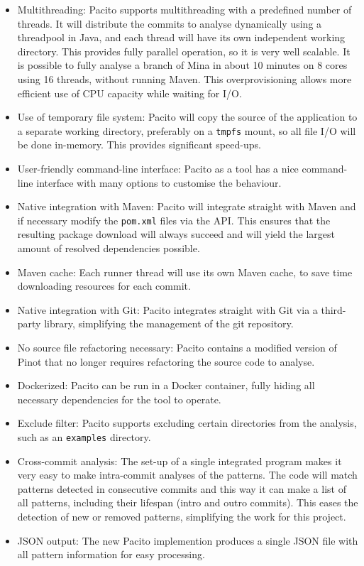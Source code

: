 \begin{itemize}
    \item Multithreading: Pacito supports multithreading with a predefined number of threads. It will distribute the commits to analyse dynamically using a threadpool in Java, and each thread will have its own independent working directory. This provides fully parallel operation, so it is very well scalable. It is possible to fully analyse a branch of Mina in about 10 minutes on 8 cores using 16 threads, without running Maven. This overprovisioning allows more efficient use of CPU capacity while waiting for I/O.
    \item Use of temporary file system: Pacito will copy the source of the application to a separate working directory, preferably on a {\tt tmpfs} mount, so all file I/O will be done in-memory. This provides significant speed-ups.
    \item User-friendly command-line interface: Pacito as a tool has a nice command-line interface with many options to customise the behaviour.
    \item Native integration with Maven: Pacito will integrate straight with Maven and if necessary modify the {\tt pom.xml} files via the API. This ensures that the resulting package download will always succeed and will yield the largest amount of resolved dependencies possible.
    \item Maven cache: Each runner thread will use its own Maven cache, to save time downloading resources for each commit.
    \item Native integration with Git: Pacito integrates straight with Git via a third-party library, simplifying the management of the git repository.
    \item No source file refactoring necessary: Pacito contains a modified version of Pinot that no longer requires refactoring the source code to analyse.
    \item Dockerized: Pacito can be run in a Docker container, fully hiding all necessary dependencies for the tool to operate.
    \item Exclude filter: Pacito supports excluding certain directories from the analysis, such as an {\tt examples} directory.
    \item Cross-commit analysis: The set-up of a single integrated program makes it very easy to make intra-commit analyses of the patterns. The code will match patterns detected in consecutive commits and this way it can make a list of all patterns, including their lifespan (intro and outro commits). This eases the detection of new or removed patterns, simplifying the work for this project.
    \item JSON output: The new Pacito implemention produces a single JSON file with all pattern information for easy processing.
\end{itemize}

